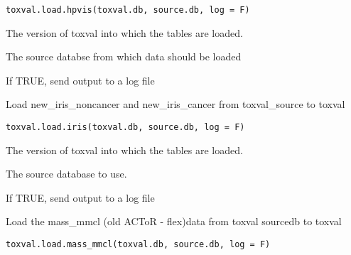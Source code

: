 \documentclass[letterpaper]{book}
\begin{document}
%
\begin{Usage}
\begin{verbatim}
toxval.load.hpvis(toxval.db, source.db, log = F)
\end{verbatim}
\end{Usage}
%
\begin{Arguments}
\begin{ldescription}
\item[\code{toxval.db}] The version of toxval into which the tables are loaded.

\item[\code{source.db}] The source databse from which data should be loaded

\item[\code{log}] If TRUE, send output to a log file
\end{ldescription}
\end{Arguments}
%
\begin{Description}\relax
Load new\_iris\_noncancer and new\_iris\_cancer from toxval\_source to toxval
\end{Description}
%
\begin{Usage}
\begin{verbatim}
toxval.load.iris(toxval.db, source.db, log = F)
\end{verbatim}
\end{Usage}
%
\begin{Arguments}
\begin{ldescription}
\item[\code{toxval.db}] The version of toxval into which the tables are loaded.

\item[\code{source.db}] The source database to use.

\item[\code{log}] If TRUE, send output to a log file
\end{ldescription}
\end{Arguments}
%
\begin{Description}\relax
Load the mass\_mmcl (old ACToR - flex)data  from toxval sourcedb to toxval
\end{Description}
%
\begin{Usage}
\begin{verbatim}
toxval.load.mass_mmcl(toxval.db, source.db, log = F)
\end{verbatim}
\end{Usage}
\end{document}
